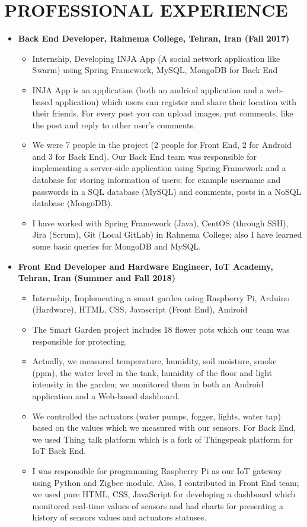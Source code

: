 \section{PROFESSIONAL EXPERIENCE}
\begin{itemize}
	\item \textbf{Back End Developer, Rahnema College, Tehran, Iran (Fall 2017)} 
		\begin{itemize}
			\item Internship, Developing INJA App (A social network application like Swarm) using Spring Framework, MySQL, MongoDB for Back End
				
				\item INJA App is an application (both an andriod application and a web-based application) which users can register and share their location with their friends. For every post you can upload images, put comments, like the post and reply to other user's comments. 
			\item We were 7 people in the project (2 people for Front End, 2 for Android and 3 for Back End). Our Back End team was responsible for implementing a server-side application using Spring Framework and a database for storing information of users; for example username and passwords in a SQL database (MySQL) and comments, posts in a NoSQL database (MongoDB).  
			\item I have worked with Spring Framework (Java), CentOS (through SSH), Jira (Scrum), Git (Local GitLab) in Rahnema College; also I have learned some basic queries for MongoDB and MySQL.
		\end{itemize}
			\vspace{+1 em}
		\item \textbf{Front End Developer and Hardware Engineer, IoT Academy, Tehran, Iran (Summer and Fall 2018)} 
		\begin{itemize}
			\item Internship, Implementing a smart garden using Raspberry Pi, Arduino (Hardware), HTML, CSS, Javascript (Front End), Android
			\item The Smart Garden project includes 18 flower pots which our team was responsible for protecting. 
			\item Actually, we measured temperature, humidity, soil moisture, smoke (ppm), the water level in the tank, humidity of the floor and light intensity in the garden; we monitored them in both an Android application and a Web-based dashboard.
			\item We controlled the actuators (water pumps, fogger, lights, water tap) based on the values which we measured with our sensors. For Back End, we used Thing talk platform which is a fork of Thingspeak platform for IoT Back End.
\item I was responsible for programming Raspberry Pi as our IoT gateway using Python and Zigbee module. Also, I contributed in Front End team; we used pure HTML, CSS, JavaScript for developing a dashboard which monitored real-time values of sensors and had charts for presenting a history of sensors values and actuators statuses.
		\end{itemize}
\end{itemize}


